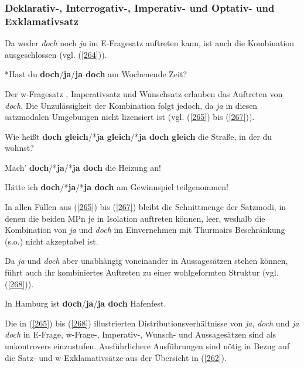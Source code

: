 \subsubsection{Deklarativ-, Interrogativ-, Imperativ- und Optativ- und Exklamativsatz}
\label{sec:exkl}
Da weder \textit{doch} noch \textit{ja} im E-Fragesatz auftreten kann, ist auch die Kombination ausgeschlossen (vgl. (\ref{264})).

\begin{exe}
	\ex\label{264} 
	*Hast du \textbf{doch}/\textbf{ja}/\textbf{ja doch} am Wochenende Zeit?
\end{exe}
Der w-Fragesatz , Imperativsatz  und Wunschsatz  erlauben das Auftreten von \textit{doch}. Die Unzulässigkeit der Kombination folgt jedoch, da \textit{ja} in diesen satzmodalen Umgebungen nicht lizensiert ist (vgl. (\ref{265}) bis (\ref{267})).
	
\begin{exe}
	\ex\label{265} 
	Wie heißt \textbf{doch gleich}/*\textbf{ja gleich}/*\textbf{ja doch gleich} die Straße, in der du wohnst?
\end{exe}	
\vspace{-0.65cm}	
\begin{exe}
	\ex\label{266} 
	Mach' \textbf{doch}/*\textbf{ja}/*\textbf{ja doch} die Heizung an!
\end{exe}
\vspace{-0.65cm}	
\begin{exe}
	\ex\label{267} 
	Hätte ich \textbf{doch}/*\textbf{ja}/*\textbf{ja doch} am Gewinnspiel teilgenommen!
\end{exe}
In allen Fällen aus (\ref{265}) bis (\ref{267}) bleibt die Schnittmenge der Satzmodi, in denen die beiden MPn je in Isolation auftreten können, leer, weshalb die Kombination von \textit{ja} und \textit{doch} im Einvernehmen mit Thurmairs Beschränkung (s.o.) nicht akzep\-tabel ist.

Da \textit{ja} und \textit{doch} aber unabhängig voneinander in Aussagesätzen stehen können, führt auch ihr kombiniertes Auftreten zu einer wohlgeformten Struktur (vgl. (\ref{268})).

\begin{exe}
	\ex\label{268} 
	In Hamburg ist \textbf{doch}/\textbf{ja}/\textbf{ja doch} Hafenfest.
\end{exe}
Die in (\ref{265}) bis (\ref{268}) illustrierten Distributionsverhältnisse von \textit{ja}, \textit{doch} und \textit{ja doch} in E-Frage, w-Frage-, Imperativ-, Wunsch- und Aussagesätzen sind als unkontrovers einzustufen. Ausführlichere Ausführungen sind nötig in Bezug auf die Satz- und w-Exklamativsätze aus der Übersicht in (\ref{262}).\\

